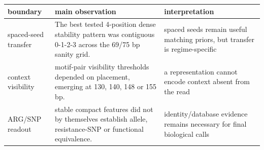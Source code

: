 \begin{tabular}{@{}p{}p{}p{}@{}}
\toprule
\textbf{boundary} & \textbf{main observation} & \textbf{interpretation} \\
\midrule
spaced-seed transfer & The best tested 4-position dense stability pattern was contiguous 0-1-2-3 across the 69/75 bp sanity grid. & spaced seeds remain useful matching priors, but transfer is regime-specific \\
context visibility & motif-pair visibility thresholds depended on placement, emerging at 130, 140, 148 or 155 bp. & a representation cannot encode context absent from the read \\
ARG/SNP readout & stable compact features did not by themselves establish allele, resistance-SNP or functional equivalence. & identity/database evidence remains necessary for final biological calls \\
\bottomrule
\end{tabular}
